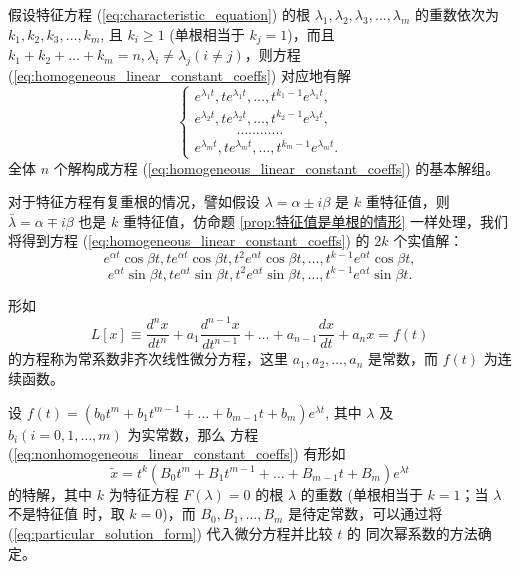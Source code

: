 \begin{proposition}[特征值有重根的情形]\label{prop:特征值有重根的情形}
假设特征方程 (\ref{eq:characteristic_equation}) 的根 $\lambda_1, \lambda_2, \lambda_3, \dots, \lambda_m$ 的重数依次为 $k_1, k_2, k_3, \dots, k_m$, 且 $k_i \ge 1$
(单根相当于 $k_j=1$)，而且 $k_1+k_2+\dots+k_m=n, \lambda_i \ne \lambda_j (i \ne j)$，则方程 (\ref{eq:homogeneous_linear_constant_coeffs}) 对应地有解
\begin{equation}
\begin{cases}
e^{\lambda_1 t}, te^{\lambda_1 t}, \dots, t^{k_1-1}e^{\lambda_1 t}, \\
e^{\lambda_2 t}, te^{\lambda_2 t}, \dots, t^{k_2-1}e^{\lambda_2 t}, \\
\quad \quad \quad \dots \dots \dots \dots \\
e^{\lambda_m t}, te^{\lambda_m t}, \dots, t^{k_m-1}e^{\lambda_m t}.
\end{cases} \label{eq:solutions_other_repeated_roots}
\end{equation}
全体 $n$ 个解构成方程 (\ref{eq:homogeneous_linear_constant_coeffs}) 的基本解组。
\end{proposition}
\begin{remark}
    对于特征方程有复重根的情况，譬如假设 $\lambda=\alpha \pm i\beta$ 是 $k$ 重特征值，则 $\bar{\lambda}=\alpha \mp i\beta$ 也是
$k$ 重特征值，仿命题 \ref{prop:特征值是单根的情形} 一样处理，我们将得到方程 (\ref{eq:homogeneous_linear_constant_coeffs}) 的 $2k$ 个实值解：
$$e^{\alpha t}\cos \beta t, te^{\alpha t}\cos \beta t, t^2e^{\alpha t}\cos \beta t, \dots, t^{k-1}e^{\alpha t}\cos \beta t,$$
$$e^{\alpha t}\sin \beta t, te^{\alpha t}\sin \beta t, t^2e^{\alpha t}\sin \beta t, \dots, t^{k-1}e^{\alpha t}\sin \beta t.$$
\end{remark}

\begin{definition}[常系数非齐次线性微分方程]\label{def:常系数非齐次线性微分方程}
    形如
\begin{equation}
L[x] \equiv \frac{d^n x}{dt^n} + a_1\frac{d^{n-1} x}{dt^{n-1}} + \dots + a_{n-1}\frac{dx}{dt} + a_nx=f(t) \label{eq:nonhomogeneous_linear_constant_coeffs}
\end{equation}
的方程称为常系数非齐次线性微分方程，这里 $a_1,a_2,\dots,a_n$ 是常数，而 $f(t)$ 为连续函数。
\end{definition}

\begin{proposition}[比较系数法的类型1]\label{prop:比较系数法的类型1}
    设 $f(t) = (b_0 t^m + b_1 t^{m-1} + \dots + b_{m-1}t + b_m)e^{\lambda t}$, 其中 $\lambda$ 及 $b_i (i=0,1,\dots,m)$ 为实常数，那么
方程 (\ref{eq:nonhomogeneous_linear_constant_coeffs}) 有形如
\begin{equation}
\tilde{x} = t^k (B_0 t^m + B_1 t^{m-1} + \dots + B_{m-1}t + B_m)e^{\lambda t} \label{eq:particular_solution_form}
\end{equation}
的特解，其中 $k$ 为特征方程 $F(\lambda)=0$ 的根 $\lambda$ 的重数 (单根相当于 $k=1$；当 $\lambda$ 不是特征值
时，取 $k=0$)，而 $B_0, B_1, \dots, B_m$ 是待定常数，可以通过将 (\ref{eq:particular_solution_form}) 代入微分方程并比较 $t$ 的
同次幂系数的方法确定。
\end{proposition}

